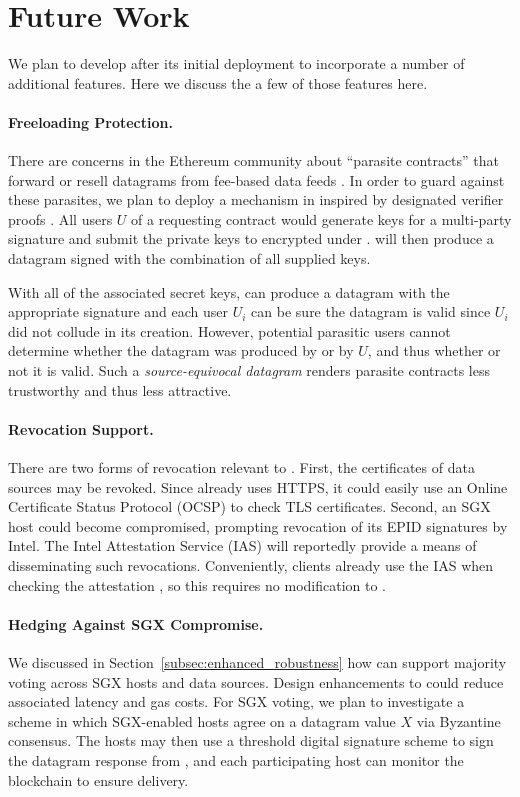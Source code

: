 \section{Future Work}
\label{sec:future-work}

We plan to develop \tc after its initial deployment to incorporate a number of additional features.
Here we discuss the a few of those features here.

\paragraph{Freeloading Protection.}
There are concerns in the Ethereum community about ``parasite contracts'' that forward or resell datagrams from fee-based data feeds \cite{parasite}.
In order to guard against these parasites, we plan to deploy a mechanism in \tc inspired by designated verifier proofs \cite{JakobssonSI1996}.
All users $U$ of a requesting contract would generate keys for a multi-party signature and submit the private keys to \tcont encrypted under \pkTC.
\tc will then produce a datagram signed with the combination of all supplied keys.

With all of the associated secret keys, \tcont can produce a datagram with the appropriate signature and each user $U_i$ can be sure the datagram is valid since $U_i$ did not collude in its creation.
However, potential parasitic users cannot determine whether the datagram was produced by \tcont or by $U$, and thus whether or not it is valid.
Such a \emph{source-equivocal datagram} renders parasite contracts less trustworthy and thus less attractive.

\paragraph{Revocation Support.}
There are two forms of revocation relevant to \tc.
First, the certificates of data sources may be revoked.
Since \tc already uses HTTPS, it could easily use an Online Certificate Status Protocol (OCSP) to check TLS certificates.
Second, an SGX host could become compromised, prompting revocation of its EPID signatures by Intel.
The Intel Attestation Service (IAS) will reportedly provide a means of disseminating such revocations.
Conveniently, clients already use the IAS when checking the attestation \sigatt, so this requires no modification to \tc.

\paragraph{Hedging Against SGX Compromise.}
We discussed in Section~\ref{subsec:enhanced_robustness} how \tc can support majority voting across SGX hosts and data sources.
Design enhancements to \tc could reduce associated latency and gas costs.
For SGX voting, we plan to investigate a scheme in which SGX-enabled \tc hosts agree on a datagram value $X$ via Byzantine consensus.
The hosts may then use a threshold digital signature scheme to sign the datagram response from \tcadd,
and each participating host can monitor the blockchain to ensure delivery.

